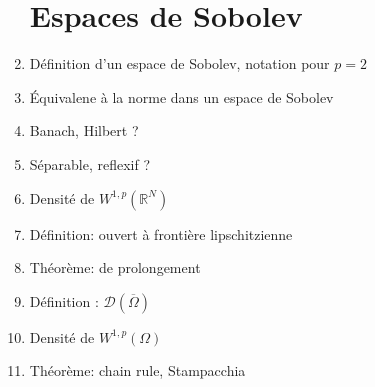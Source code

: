 \documentclass{article}
\begin{document}
\begin{enumerate}
\section{Espaces de Sobolev}
	\item Définition d'un espace de Sobolev, notation pour $p=2$
	\item Équivalene à la norme dans un espace de Sobolev
	\item Banach, Hilbert ?
	\item Séparable, reflexif ?
	\item Densité de $W^{1,p}(\mathbb{R}^N)$
	\item Définition: ouvert à frontière lipschitzienne
	\item Théorème: de prolongement
	\item Définition : $\mathcal{D}(\overline{\Omega})$
	\item Densité de $W^{1,p}(\Omega)$
	\item Théorème: chain rule, Stampacchia
\end{enumerate}
\end{document}
